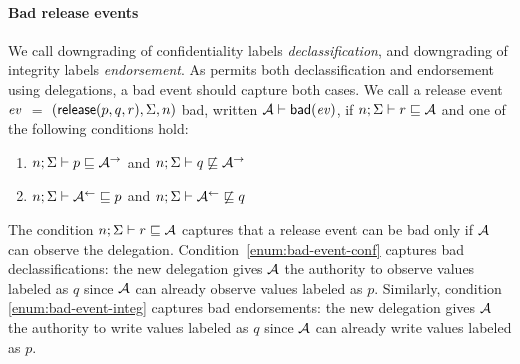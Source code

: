 \paragraph{Bad release events}
We call downgrading of confidentiality labels \emph{declassification}, and downgrading of integrity labels \emph{endorsement}. As \lang{} permits both declassification and endorsement using delegations, a bad event should capture both cases. We call a release event $\mathit{ev}$ $=$ $(\mathsf{release}(p, q, r), \Sigma, n)$ bad, written $\mathcal{A} \vdash \mathsf{bad}(\mathit{ev})$, if $n; \Sigma \vdash r \sqsubseteq \mathcal{A}$ and one of the following conditions hold:
\begin{enumerate}
    \item \label{enum:bad-event-conf} $n; \Sigma \vdash p \sqsubseteq \mathcal{A}^{\rightarrow}$ and $n; \Sigma \vdash q \not\sqsubseteq \mathcal{A}^{\rightarrow}$
    \item \label{enum:bad-event-integ} $n; \Sigma \vdash \mathcal{A}^{\leftarrow} \sqsubseteq p$ and $n; \Sigma \vdash \mathcal{A}^{\leftarrow} \not\sqsubseteq q$
\end{enumerate}
The condition $n; \Sigma \vdash r \sqsubseteq \mathcal{A}$ captures that a release event can be bad only if $\mathcal{A}$ can observe the delegation. Condition~\ref{enum:bad-event-conf} captures bad declassifications: the new delegation gives $\mathcal{A}$ the authority to observe values labeled as $q$ since $\mathcal{A}$ can already observe values labeled as $p$. Similarly, condition \ref{enum:bad-event-integ} captures bad endorsements: the new delegation gives $\mathcal{A}$ the authority to write values labeled as $q$ since $\mathcal{A}$ can already write values labeled as $p$.

